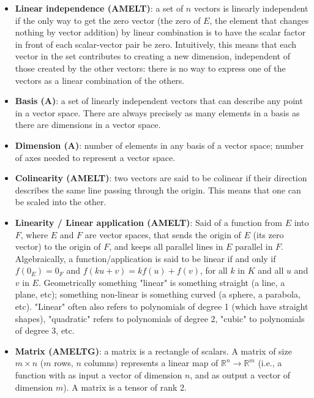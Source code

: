 \documentclass{article}
\begin{document}
\begin{itemize}
	\item \textbf{Linear independence (AMELT)}: a set of $n$ vectors is linearly independent if the only way to get the zero vector (the zero of $E$, the element that changes nothing by vector addition) by linear combination is to have the scalar factor in front of each scalar-vector pair be zero. Intuitively, this means that each vector in the set contributes to creating a new dimension, independent of those created by the other vectors: there is no way to express one of the vectors as a linear combination of the others.

	\item \textbf{Basis (A)}: a set of linearly independent vectors that can describe any point in a vector space. There are always precisely as many elements in a basis as there are dimensions in a vector space.

	\item \textbf{Dimension (A)}: number of elements in any basis of a vector space; number of axes needed to represent a vector space.

	\item \textbf{Colinearity (AMELT)}: two vectors are said to be colinear if their direction describes the same line passing through the origin. This means that one can be scaled into the other.

	\item \textbf{Linearity / Linear application (AMELT)}: Said of a function from $E$ into $F$, where $E$ and $F$ are vector spaces, that sends the origin of $E$ (its zero vector) to the origin of $F$, and keeps all parallel lines in $E$ parallel in $F$. Algebraically, a function/application is said to be linear if and only if $f(0_E) = 0_F$ and $f(ku+v) = kf(u) + f(v)$, for all $k$ in $K$ and all $u$ and $v$ in $E$. Geometrically something "linear" is something straight (a line, a plane, etc); something non-linear is something curved (a sphere, a parabola, etc). "Linear" often also refers to polynomials of degree 1 (which have straight shapes), "quadratic" refers to polynomials of degree 2, "cubic" to polynomials of degree 3, etc.

	\item \textbf{Matrix (AMELTG)}: a matrix is a rectangle of scalars. A matrix of size $m \times n$ ($m$ rows, $n$ columns) represents a linear map of $\mathbb{R}^n \rightarrow \mathbb{R}^m$ (i.e., a function with as input a vector of dimension $n$, and as output a vector of dimension $m$). A matrix is a tensor of rank 2.


\end{itemize}
\end{document}
